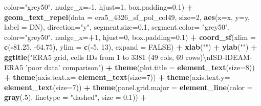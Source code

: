 \documentclass[12pt,oneside]{reedthesis}
\newenvironment{Shaded}{\begin{snugshade}}{\end{snugshade}}
\newcommand{\CharTok}[1]{\textcolor[rgb]{0.31,0.60,0.02}{#1}}
\newcommand{\DataTypeTok}[1]{\textcolor[rgb]{0.13,0.29,0.53}{#1}}
\newcommand{\DecValTok}[1]{\textcolor[rgb]{0.00,0.00,0.81}{#1}}
\newcommand{\FloatTok}[1]{\textcolor[rgb]{0.00,0.00,0.81}{#1}}
\newcommand{\KeywordTok}[1]{\textcolor[rgb]{0.13,0.29,0.53}{\textbf{#1}}}
\newcommand{\NormalTok}[1]{#1}
\newcommand{\OperatorTok}[1]{\textcolor[rgb]{0.81,0.36,0.00}{\textbf{#1}}}
\newcommand{\OtherTok}[1]{\textcolor[rgb]{0.56,0.35,0.01}{#1}}
\newcommand{\StringTok}[1]{\textcolor[rgb]{0.31,0.60,0.02}{#1}}
\begin{document}
\begin{Shaded}
\begin{Highlighting}[]
{{{{   \DataTypeTok{color=}\StringTok{"grey50"}\NormalTok{, }\DataTypeTok{nudge_x=}\OperatorTok{-}\DecValTok{1}\NormalTok{, }\DataTypeTok{hjust=}\DecValTok{1}\NormalTok{, }\DataTypeTok{box.padding=}\FloatTok{0.1}\NormalTok{) }\OperatorTok{+}
\StringTok{  }\KeywordTok{geom_text_repel}\NormalTok{(}\DataTypeTok{data =}\NormalTok{ era5_}\DecValTok{4326}\NormalTok{_sf_pol_col49, }\DataTypeTok{size=}\DecValTok{2}\NormalTok{, }\KeywordTok{aes}\NormalTok{(}\DataTypeTok{x=}\NormalTok{x, }\DataTypeTok{y=}\NormalTok{y, }\DataTypeTok{label =}\NormalTok{ DN), }\DataTypeTok{direction=}\StringTok{"y"}\NormalTok{, }\DataTypeTok{segment.size=}\FloatTok{0.1}\NormalTok{, }\DataTypeTok{segment.color=} \StringTok{"grey50"}\NormalTok{, }
   \DataTypeTok{color=}\StringTok{"grey50"}\NormalTok{, }\DataTypeTok{nudge_x=}\OperatorTok{+}\DecValTok{1}\NormalTok{, }\DataTypeTok{hjust=}\DecValTok{0}\NormalTok{, }\DataTypeTok{box.padding=}\FloatTok{0.1}\NormalTok{) }\OperatorTok{+}
\StringTok{  }\KeywordTok{coord_sf}\NormalTok{(}\DataTypeTok{xlim =} \KeywordTok{c}\NormalTok{(}\OperatorTok{-}\FloatTok{81.25}\NormalTok{, }\FloatTok{-64.75}\NormalTok{), }\DataTypeTok{ylim =} \KeywordTok{c}\NormalTok{(}\OperatorTok{-}\DecValTok{5}\NormalTok{, }\DecValTok{13}\NormalTok{), }\DataTypeTok{expand =} \OtherTok{FALSE}\NormalTok{) }\OperatorTok{+}
\StringTok{  }\KeywordTok{xlab}\NormalTok{(}\StringTok{""}\NormalTok{) }\OperatorTok{+}\StringTok{ }
\StringTok{  }\KeywordTok{ylab}\NormalTok{(}\StringTok{""}\NormalTok{) }\OperatorTok{+}\StringTok{ }
\StringTok{  }\KeywordTok{ggtitle}\NormalTok{(}\StringTok{"ERA5 grid, cells IDs from 1 to 3381 (49 cols, 69 rows)}\CharTok{\textbackslash{}n}\StringTok{ISD-IDEAM-ERA5 'poor data' comparison"}\NormalTok{) }\OperatorTok{+}\StringTok{ }
\StringTok{  }\KeywordTok{theme}\NormalTok{(}\DataTypeTok{plot.title =} \KeywordTok{element_text}\NormalTok{(}\DataTypeTok{size=}\DecValTok{8}\NormalTok{)) }\OperatorTok{+}
\StringTok{  }\KeywordTok{theme}\NormalTok{(}\DataTypeTok{axis.text.x=} \KeywordTok{element_text}\NormalTok{(}\DataTypeTok{size=}\DecValTok{7}\NormalTok{)) }\OperatorTok{+}\StringTok{ }
\StringTok{  }\KeywordTok{theme}\NormalTok{(}\DataTypeTok{axis.text.y=} \KeywordTok{element_text}\NormalTok{(}\DataTypeTok{size=}\DecValTok{7}\NormalTok{)) }\OperatorTok{+}
\StringTok{  }\KeywordTok{theme}\NormalTok{(}\DataTypeTok{panel.grid.major =} \KeywordTok{element_line}\NormalTok{(}\DataTypeTok{color =} \KeywordTok{gray}\NormalTok{(.}\DecValTok{5}\NormalTok{), }\DataTypeTok{linetype =} \StringTok{"dashed"}\NormalTok{, }\DataTypeTok{size =} \FloatTok{0.1}\NormalTok{)) }\OperatorTok{+}
}}}}
\end{Highlighting}
\end{Shaded}
\end{document}

